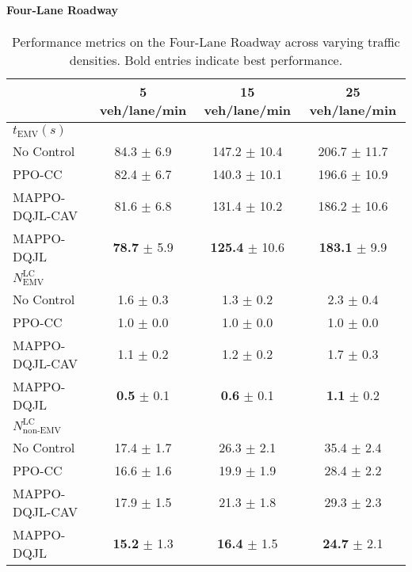 \paragraph{Four-Lane Roadway}
\begin{table}[htbp]
\centering
\begin{tabular}{lccc}
\toprule
& 5 veh/lane/min & 15 veh/lane/min & 25 veh/lane/min \\
\midrule
\multicolumn{4}{l}{\textbf{\textit{$t_{\text{EMV}} (s)$}}} \\[4pt]
No Control        & 84.3 $\pm$ 6.9  & 147.2 $\pm$ 10.4 & 206.7 $\pm$ 11.7 \\
PPO-CC~\cite{suo2024model} & 82.4 $\pm$ 6.7  & 140.3 $\pm$ 10.1 & 196.6 $\pm$ 10.9 \\
MAPPO-DQJL-CAV    & 81.6 $\pm$ 6.8  & 131.4 $\pm$ 10.2 & 186.2 $\pm$ 10.6 \\
MAPPO-DQJL        & \textbf{78.7} $\pm$ 5.9 & \textbf{125.4} $\pm$ 10.6 & \textbf{183.1} $\pm$ 9.9 \\
\midrule
\textbf{\textit{\boldmath$N_{\text{EMV}}^{\text{LC}}$}} & & & \\ 
No Control        & 1.6 $\pm$ 0.3 & 1.3 $\pm$ 0.2 & 2.3 $\pm$ 0.4 \\
PPO-CC~\cite{suo2024model} & 1.0 $\pm$ 0.0 & 1.0 $\pm$ 0.0 & 1.0 $\pm$ 0.0 \\
MAPPO-DQJL-CAV    & 1.1 $\pm$ 0.2 & 1.2 $\pm$ 0.2 & 1.7 $\pm$ 0.3 \\
MAPPO-DQJL        & \textbf{0.5} $\pm$ 0.1 & \textbf{0.6} $\pm$ 0.1 & \textbf{1.1} $\pm$ 0.2 \\
\midrule
\textbf{\textit{\boldmath$N_{\text{non-EMV}}^{\text{LC}}$}} & & & \\ 
No Control        & 17.4 $\pm$ 1.7 & 26.3 $\pm$ 2.1 & 35.4 $\pm$ 2.4 \\
PPO-CC~\cite{suo2024model} & 16.6 $\pm$ 1.6 & 19.9 $\pm$ 1.9 & 28.4 $\pm$ 2.2 \\
MAPPO-DQJL-CAV    & 17.9 $\pm$ 1.5 & 21.3 $\pm$ 1.8 & 29.3 $\pm$ 2.3 \\
MAPPO-DQJL        & \textbf{15.2} $\pm$ 1.3 & \textbf{16.4} $\pm$ 1.5 & \textbf{24.7} $\pm$ 2.1 \\
\bottomrule
\end{tabular}
\caption{Performance metrics on the Four-Lane Roadway across varying traffic densities. Bold entries indicate best performance.}
\label{tab:density_four_lane}
\end{table}
